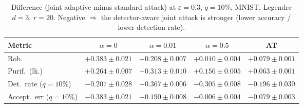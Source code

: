 \begin{table}[htbp]
  \centering
  \begin{tabular}{lcccc}
    \toprule
    Metric & $\alpha{=}0$ & $\alpha{=}0.01$ & $\alpha{=}0.5$ & AT \\
    \midrule
    Rob. & $+0.383 \pm 0.021$ & $+0.208 \pm 0.007$ & $+0.010 \pm 0.004$ & $+0.079 \pm 0.001$ \\
    Purif.\ (lk.) & $+0.264 \pm 0.007$ & $+0.313 \pm 0.010$ & $+0.156 \pm 0.005$ & $+0.063 \pm 0.001$ \\
    Det.\ rate ($q{=}10\%$) & $-0.207 \pm 0.028$ & $-0.367 \pm 0.006$ & $-0.305 \pm 0.008$ & $-0.196 \pm 0.030$ \\
    Accept.\ err ($q{=}10\%$) & $-0.383 \pm 0.021$ & $-0.190 \pm 0.008$ & $-0.006 \pm 0.004$ & $-0.079 \pm 0.003$ \\
    \bottomrule
  \end{tabular}
  \caption{Difference (joint adaptive minus standard attack) at $\varepsilon=0.3$, $q{=}10\%$, MNIST, Legendre $d{=}3$, $r{=}20$. Negative $\Rightarrow$ the detector-aware joint attack is stronger (lower accuracy / lower detection rate).}
  \label{tab:joint_vs_normal_mnist_eps0.3}
\end{table}

